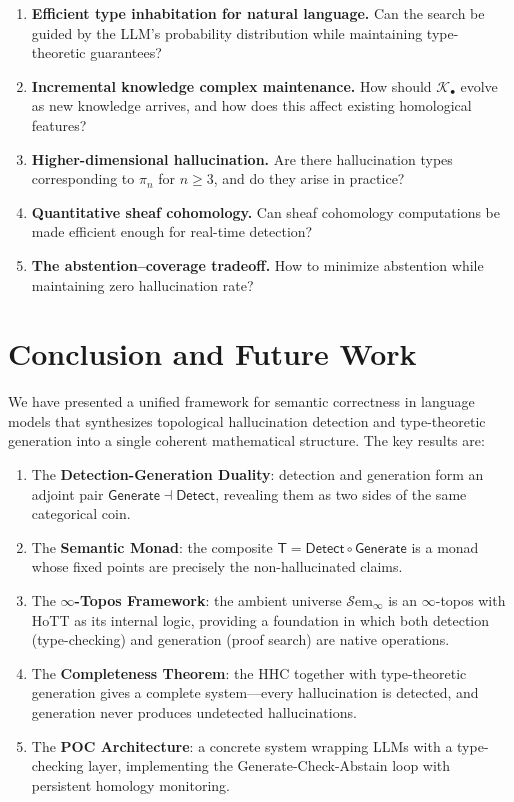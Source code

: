 \documentclass[11pt,a4paper]{article}
\theoremstyle{plain}
\theoremstyle{definition}
\theoremstyle{remark}
\newcommand{\Detect}{\mathsf{Detect}}
\newcommand{\Generate}{\mathsf{Generate}}
\newcommand{\SemanticT}{\mathsf{T}}
\begin{document}
\begin{enumerate}[leftmargin=*]
  \item \textbf{Efficient type inhabitation for natural language.} Can the search be guided by the LLM's probability distribution while maintaining type-theoretic guarantees?
  \item \textbf{Incremental knowledge complex maintenance.} How should $\mathcal{K}_\bullet$ evolve as new knowledge arrives, and how does this affect existing homological features?
  \item \textbf{Higher-dimensional hallucination.} Are there hallucination types corresponding to $\pi_n$ for $n \geq 3$, and do they arise in practice?
  \item \textbf{Quantitative sheaf cohomology.} Can sheaf cohomology computations be made efficient enough for real-time detection?
  \item \textbf{The abstention--coverage tradeoff.} How to minimize abstention while maintaining zero hallucination rate?
\end{enumerate}


\section{Conclusion and Future Work}\label{sec:conclusion}

We have presented a unified framework for semantic correctness in language models that synthesizes topological hallucination detection and type-theoretic generation into a single coherent mathematical structure. The key results are:

\begin{enumerate}[leftmargin=*]
  \item The \textbf{Detection-Generation Duality}: detection and generation form an adjoint pair $\Generate \dashv \Detect$, revealing them as two sides of the same categorical coin.

  \item The \textbf{Semantic Monad}: the composite $\SemanticT = \Detect \circ \Generate$ is a monad whose fixed points are precisely the non-hallucinated claims.

  \item The \textbf{$\infty$-Topos Framework}: the ambient universe $\mathcal{S}\mathrm{em}_\infty$ is an $\infty$-topos with HoTT as its internal logic, providing a foundation in which both detection (type-checking) and generation (proof search) are native operations.

  \item The \textbf{Completeness Theorem}: the HHC together with type-theoretic generation gives a complete system---every hallucination is detected, and generation never produces undetected hallucinations.

  \item The \textbf{POC Architecture}: a concrete system wrapping LLMs with a type-checking layer, implementing the Generate-Check-Abstain loop with persistent homology monitoring.
\end{enumerate}
\end{document}
